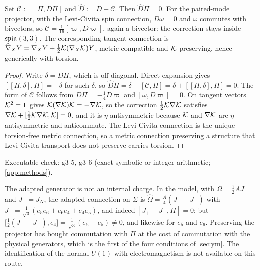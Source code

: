 \begin{proposition}
\label{prop:adapted}
Set $\mathcal C:=[\Pi,D\Pi]$ and $\widehat D:=D+\mathcal C$. Then $\widehat D\Pi=0$. For the paired-mode projector, with the Levi-Civita spin connection,
$D\omega=0$ and $\omega$ commutes with bivectors, so $\mathcal C=\tfrac1{16}[\varpi,D\varpi]$, again a bivector: the correction stays inside $\mathfrak{spin}(3,3)$. The
corresponding tangent connection is $\widehat\nabla_XY=\nabla_XY+\tfrac12\mathcal K(\nabla_X\mathcal K)Y$, metric-compatible and $\mathcal K$-preserving, hence generically with torsion.
\end{proposition}

\begin{proof}
Write $\delta=D\Pi$, which is off-diagonal. Direct expansion gives $[[\Pi,\delta],\Pi]=-\delta$ for such $\delta$, so $\widehat D\Pi=\delta+[\mathcal C,\Pi]=\delta+[[\Pi,\delta],\Pi]=0$.
The form of $\mathcal C$ follows from $D\Pi=-\tfrac14D\varpi$ and $[\omega,D\varpi]=0$. On tangent vectors $\mathcal K^2=\mathbf 1$ gives $\mathcal K(\nabla\mathcal K)\mathcal K=-\nabla\mathcal K$, so the
correction $\tfrac12\mathcal K\nabla\mathcal K$ satisfies $\nabla\mathcal K+[\tfrac12\mathcal K\nabla\mathcal K,\mathcal K]=0$, and it is $\eta$-antisymmetric because $\mathcal K$ and $\nabla\mathcal K$ are $\eta$-antisymmetric and
anticommute. The Levi-Civita connection is the unique torsion-free metric connection, so a metric connection preserving a structure that Levi-Civita transport
does not preserve carries torsion.
\end{proof}

\noindent Executable check: g3-5, g3-6 (exact symbolic or integer arithmetic; \cref{app:methods}).

The adapted generator is not an internal charge. In the model, with $\Omega=\tfrac12AJ_+$ and $J_+=J_N$, the adapted connection on $\Sigma$ is
$\widehat\Omega=\tfrac A4(J_+-J_-)$ with $J_-=\tfrac1{\sqrt3}(e_5e_6+e_6e_4+e_4e_5)$, and indeed $[J_+-J_-,\Pi]=0$; but $\bigl[\tfrac12(J_+-J_-),e_4\bigr]=\tfrac1{\sqrt3}(e_6-e_5)\neq0$,
and likewise for $e_5$ and $e_6$. Preserving the projector has bought commutation with $\Pi$ at the cost of commutation with the physical generators, which is the
first of the four conditions of \cref{sec:ym}. The identification of the normal $U(1)$ with electromagnetism is not available on this route.

